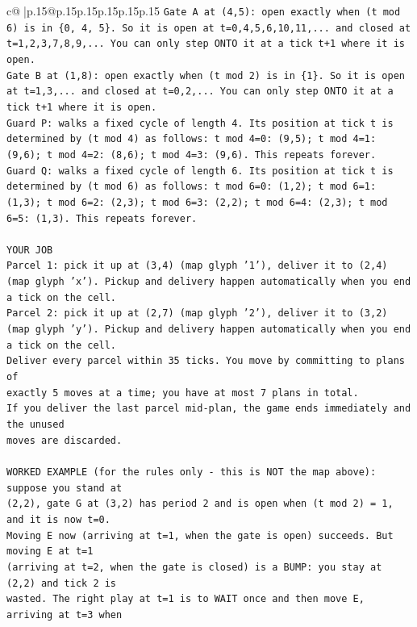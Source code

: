 \documentclass{article}
\begin{document}
{\begin{supertabular}{c@{$\;$}|p{.15\linewidth}@{}p{.15\linewidth}p{.15\linewidth}p{.15\linewidth}p{.15\linewidth}p{.15\linewidth}}
{{{\texttt{Gate A at (4,5): open exactly when (t mod 6) is in \{0, 4, 5\}. So it is open at t=0,4,5,6,10,11,... and closed at t=1,2,3,7,8,9,... You can only step ONTO it at a tick t+1 where it is open.} \\
\texttt{Gate B at (1,8): open exactly when (t mod 2) is in \{1\}. So it is open at t=1,3,... and closed at t=0,2,... You can only step ONTO it at a tick t+1 where it is open.} \\
\texttt{Guard P: walks a fixed cycle of length 4. Its position at tick t is determined by (t mod 4) as follows: t mod 4=0: (9,5); t mod 4=1: (9,6); t mod 4=2: (8,6); t mod 4=3: (9,6). This repeats forever.} \\
\texttt{Guard Q: walks a fixed cycle of length 6. Its position at tick t is determined by (t mod 6) as follows: t mod 6=0: (1,2); t mod 6=1: (1,3); t mod 6=2: (2,3); t mod 6=3: (2,2); t mod 6=4: (2,3); t mod 6=5: (1,3). This repeats forever.} \\
\\ 
\texttt{YOUR JOB} \\
\texttt{Parcel 1: pick it up at (3,4) (map glyph '1'), deliver it to (2,4) (map glyph 'x'). Pickup and delivery happen automatically when you end a tick on the cell.} \\
\texttt{Parcel 2: pick it up at (2,7) (map glyph '2'), deliver it to (3,2) (map glyph 'y'). Pickup and delivery happen automatically when you end a tick on the cell.} \\
\texttt{Deliver every parcel within 35 ticks. You move by committing to plans of} \\
\texttt{exactly 5 moves at a time; you have at most 7 plans in total.} \\
\texttt{If you deliver the last parcel mid{-}plan, the game ends immediately and the unused} \\
\texttt{moves are discarded.} \\
\\ 
\texttt{WORKED EXAMPLE (for the rules only {-} this is NOT the map above): suppose you stand at} \\
\texttt{(2,2), gate G at (3,2) has period 2 and is open when (t mod 2) = 1, and it is now t=0.} \\
\texttt{Moving E now (arriving at t=1, when the gate is open) succeeds. But moving E at t=1} \\
\texttt{(arriving at t=2, when the gate is closed) is a BUMP: you stay at (2,2) and tick 2 is} \\
\texttt{wasted. The right play at t=1 is to WAIT once and then move E, arriving at t=3 when} \\
}}}
\end{supertabular}}
\end{document}
